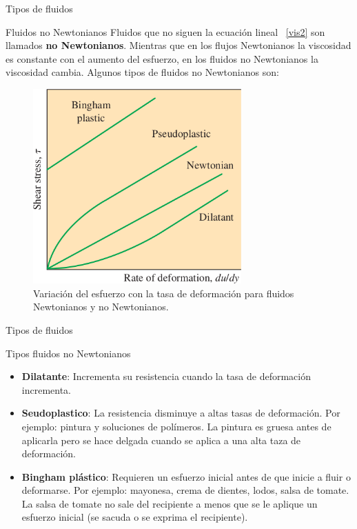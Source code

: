 \documentclass [xcolor=svgnames, t] {beamer}
\begin{document}
\begin{frame}{Tipos de fluidos}
\begin{block}{Fluidos no Newtonianos}
Fluidos que no siguen la ecuaci\'on lineal ~\ref{vis2} son llamados \textbf{no Newtonianos}. Mientras que en los flujos Newtonianos la viscosidad es constante con el aumento del esfuerzo, en los fluidos no Newtonianos la viscosidad cambia. Algunos tipos de fluidos no Newtonianos son:
\end{block}
\begin{figure}[h]
\centering
\includegraphics[width=8cm]{nonew}
\caption{Variaci\'on del esfuerzo con la tasa de deformaci\'on para fluidos Newtonianos y no Newtonianos.}
\label{nonew}
\end{figure}
\end{frame}

\begin{frame}{Tipos de fluidos}
\begin{block}{Tipos fluidos no Newtonianos}
\begin{itemize}
\item \textbf{Dilatante}: Incrementa su resistencia cuando la tasa de deformaci\'on incrementa.
\item \textbf{Seudoplastico}: La resistencia disminuye a altas tasas de deformaci\'on. Por ejemplo: pintura y soluciones de pol\'imeros. La pintura es gruesa antes de aplicarla pero se hace delgada cuando se aplica a una alta taza de deformaci\'on.
\item \textbf{Bingham pl\'astico}: Requieren un esfuerzo inicial antes de que inicie a fluir o deformarse. Por ejemplo: mayonesa, crema de dientes, lodos, salsa de tomate. La salsa de tomate no sale del recipiente a menos que se le aplique un esfuerzo inicial (se sacuda o se exprima el recipiente). 
\end{itemize}
\end{block}
\end{frame}
\end{document}

